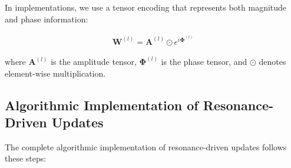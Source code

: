In implementations, we use a tensor encoding that represents both magnitude and phase information:

\begin{align}
\mathbf{W}^{(l)} = \mathbf{A}^{(l)} \odot e^{i\mathbf{\Phi}^{(l)}}
\end{align}

where $\mathbf{A}^{(l)}$ is the amplitude tensor, $\mathbf{\Phi}^{(l)}$ is the phase tensor, and $\odot$ denotes element-wise multiplication.

\subsection{Algorithmic Implementation of Resonance-Driven Updates}

The complete algorithmic implementation of resonance-driven updates follows these steps:

